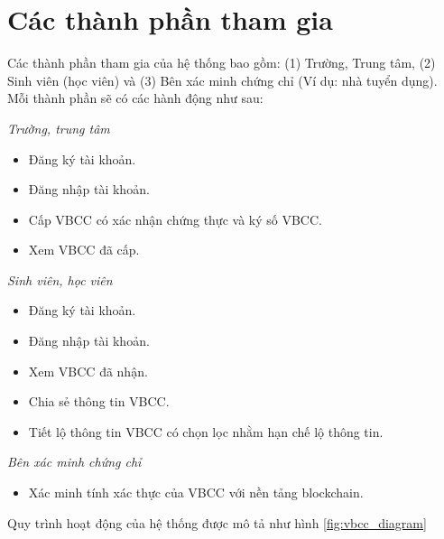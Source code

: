 \section{Các thành phần tham gia}
Các thành phần tham gia của hệ thống bao gồm: (1) Trường, Trung tâm, (2) Sinh viên (học viên) và (3) Bên xác minh chứng chỉ (Ví dụ: nhà tuyển dụng). Mỗi thành phần sẽ có các hành động như sau:

\emph{Trường, trung tâm}

\begin{itemize}
\item Đăng ký tài khoản.
\item Đăng nhập tài khoản.
\item Cấp VBCC có xác nhận chứng thực và ký số VBCC.
\item Xem VBCC đã cấp.
\end{itemize}

\emph{Sinh viên, học viên}

\begin{itemize}
\item Đăng ký tài khoản.
\item Đăng nhập tài khoản.
\item Xem VBCC đã nhận.
\item Chia sẻ thông tin VBCC.
\item Tiết lộ thông tin VBCC có chọn lọc nhằm hạn chế lộ thông tin.
\end{itemize}

\emph{Bên xác minh chứng chỉ}

\begin{itemize}
\item Xác minh tính xác thực của VBCC với nền tảng blockchain.
\end{itemize}


Quy trình hoạt động của hệ thống được mô tả như hình \ref{fig:vbcc_diagram}

